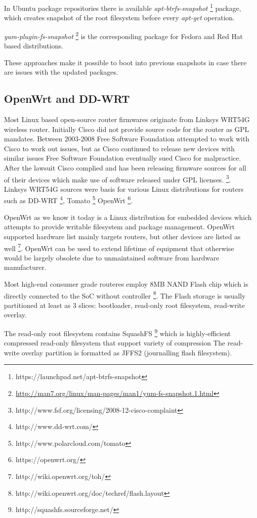 \documentclass{article}
\begin{document}
In Ubuntu package repositories there is available \emph{apt-btrfs-snapshot}
\footnote{https://launchpad.net/apt-btrfs-snapshot} package,
which creates snapshot of the root filesystem before every
\emph{apt-get} operation.

\emph{yum-plugin-fs-snapshot}
\footnote{\url{http://man7.org/linux/man-pages/man1/yum-fs-snapshot.1.html}}
is the corresponding package for Fedora and
Red Hat based distributions.

These approaches make it possible to boot into previous snapshots
in case there are issues with the updated packages.


\subsection{OpenWrt and DD-WRT}

Most Linux based open-source router firmwares originate from Linksys WRT54G
wireless router.
Initially Cisco did not provide source code for the router as GPL mandates.
Between 2003-2008 Free Software Foundation attempted to work with Cisco
to work out issues, but as Cisco continued to release new devices with similar
issues Free Software Foundation eventually sued Cisco for malpractice.
After the lawsuit Cisco complied and has been releasing firmware sources for
all of their devices which make use of software released under GPL licenses.
\footnote{http://www.fsf.org/licensing/2008-12-cisco-complaint}.
Linksys WRT54G sources were basis for various Linux distributions for routers such as
DD-WRT \footnote{http://www.dd-wrt.com/},
Tomato \footnote{http://www.polarcloud.com/tomato}
OpenWrt \footnote{https://openwrt.org/}.

OpenWrt as we know it today is a Linux distribution for embedded devices
which attempts to provide writable filesystem and package management.
OpenWrt supported hardware list mainly targets routers, but other devices are
listed as well \footnote{http://wiki.openwrt.org/toh/}. OpenWrt can be used to
extend lifetime of equipment that otherwise would be largely obsolete due
to unmaintained software from hardware manufacturer.

Most high-end consumer grade routeres employ 8MB NAND Flash chip which is
directly connected to the SoC without controller
\footnote{http://wiki.openwrt.org/doc/techref/flash.layout}.
The Flash storage is usually partitioned at least as 3 slices:
bootloader, read-only root filesystem, read-write overlay.

The read-only root filesystem contains SquashFS
\footnote{http://squashfs.sourceforge.net/}
which is highly-efficient compressed read-only filesystem that support variety
of compression The read-write overlay partition is formatted as JFFS2
(journalling flash filesystem).
\end{document}
